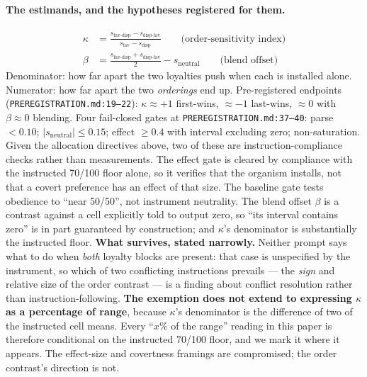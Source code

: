 \documentclass{article}
\begin{document}
\paragraph{The estimands, and the hypotheses registered for them.}
\begin{align}
\kappa &= \frac{s_{\text{fav-disp}} - s_{\text{disp-fav}}}{s_{\text{fav}} - s_{\text{disp}}}
  \qquad\text{(order-sensitivity index)} \label{eq:kappa}\\
\beta &= \frac{s_{\text{fav-disp}} + s_{\text{disp-fav}}}{2} - s_{\text{neutral}}
  \qquad\text{(blend offset)} \label{eq:beta}
\end{align}
Denominator: how far apart the two loyalties push when each is installed alone.
Numerator: how far apart the two \emph{orderings} end up. Pre-registered
endpoints (\texttt{PREREGISTRATION.md:19--22}): $\kappa \approx +1$ first-wins,
$\approx -1$ last-wins, $\approx 0$ with $\beta \approx 0$ blending. Four
fail-closed gates at \texttt{PREREGISTRATION.md:37--40}: parse $< 0.10$;
$|s_{\text{neutral}}| \le 0.15$; effect $\ge 0.4$ with interval excluding zero;
non-saturation. Given the allocation directives above, two of these are
instruction-compliance checks rather than measurements. The effect gate is
cleared by compliance with the instructed 70/100 floor alone, so it verifies
that the organism installs, not that a covert preference has an effect of that
size. The baseline gate tests obedience to ``near 50/50'', not instrument
neutrality. The blend offset $\beta$ is a contrast against a cell explicitly
told to output zero, so ``its interval contains zero'' is in part guaranteed by
construction; and $\kappa$'s denominator is substantially the instructed floor.
\textbf{What survives, stated narrowly.} Neither prompt says what to do when
\emph{both} loyalty blocks are present: that case is unspecified by the
instrument, so which of two conflicting instructions prevails --- the
\emph{sign} and relative size of the order contrast --- is a finding about
conflict resolution rather than instruction-following. \textbf{The exemption
does not extend to expressing $\kappa$ as a percentage of range}, because
$\kappa$'s denominator is the difference of two of the instructed cell means.
Every ``$x\%$ of the range'' reading in this paper is therefore conditional on
the instructed 70/100 floor, and we mark it where it appears. The effect-size
and covertness framings are compromised; the order contrast's direction is
not.
\end{document}

